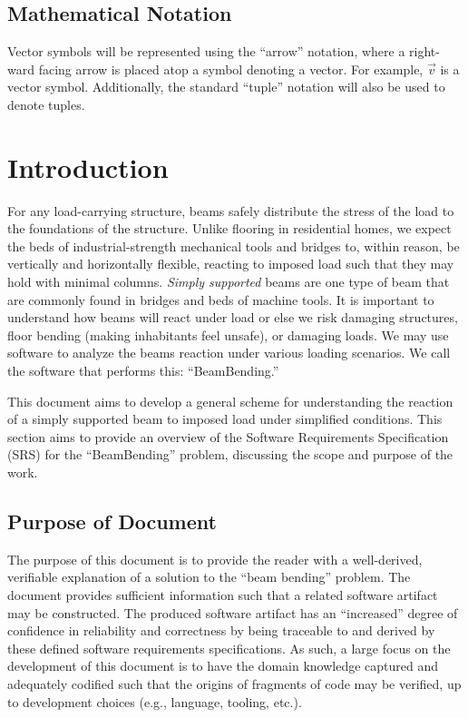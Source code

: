 \documentclass[12pt]{article}
\begin{document}
\subsection{Mathematical Notation}

Vector symbols will be represented using the ``arrow'' notation, where a
right-ward facing arrow is placed atop a symbol denoting a vector. For example,
\(\vec{v}\) is a vector symbol. Additionally, the standard ``tuple'' notation
will also be used to denote tuples.

\newpage



\section{Introduction}

For any load-carrying structure, beams safely distribute the stress of the load
to the foundations of the structure. Unlike flooring in residential homes, we
expect the beds of industrial-strength mechanical tools and bridges to, within
reason, be vertically and horizontally flexible, reacting to imposed load such
that they may hold with minimal columns. \textit{Simply supported} beams are one
type of beam that are commonly found in bridges and beds of machine tools. It is
important to understand how beams will react under load or else we risk damaging
structures, floor bending (making inhabitants feel unsafe), or damaging loads.
We may use software to analyze the beams reaction under various loading
scenarios. We call the software that performs this: ``BeamBending.''

This document aims to develop a general scheme for understanding the reaction of
a simply supported beam to imposed load under simplified conditions. This
section aims to provide an overview of the Software Requirements Specification
(SRS) for the ``BeamBending'' problem, discussing the scope and purpose of the
work.

\subsection{Purpose of Document}

The purpose of this document is to provide the reader with a well-derived,
verifiable explanation of a solution to the ``beam bending'' problem. The
document provides sufficient information such that a related software artifact
may be constructed. The produced software artifact has an ``increased'' degree
of confidence in reliability and correctness by being traceable to and derived
by these defined software requirements specifications. As such, a large focus on
the development of this document is to have the domain knowledge captured and
adequately codified such that the origins of fragments of code may be verified,
up to development choices (e.g., language, tooling, etc.).
\end{document}

